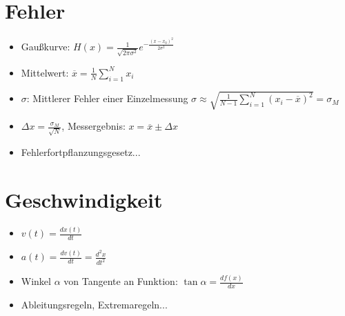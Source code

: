\documentclass[a4paper,10pt, fleqn]{article}
\begin{document}
\section{Fehler}
\label{sec:fehler}

\begin{itemize}
\item Gaußkurve:
  $H(x) =
  \frac{1}{\sqrt{2\pi\sigma^{2}}}e^{-\frac{(x-x_{0})^{2}}{2\sigma^{2}}}$
\item Mittelwert: $\overline{x} = \frac{1}{N}\sum_{i=1}^N x_i$
\item $\sigma$: Mittlerer Fehler einer Einzelmessung $\sigma \approx \sqrt{\frac{1}{N-1}\sum^N_{i=1}(x_i - \overline{x})^2} = \sigma_M $

\item $\Delta x = \frac{\sigma_M}{\sqrt{N}}$,
  Messergebnis: $x = \overline{x} \pm \Delta x$
\item Fehlerfortpflanzungsgesetz...
\end{itemize}

\section{Geschwindigkeit}
\label{sec:geschwindigkeit}
\begin{itemize}
\item $v(t) = \frac{dx(t)}{dt}$
\item $a(t) = \frac{dv(t)}{dt} = \frac{d^{2}x}{dt^{2}}$
\item Winkel $\alpha$
  von Tangente an Funktion: $\tan\alpha = \frac{df(x)}{dx}$

\item Ableitungsregeln, Extremaregeln...
\end{itemize}
\end{document}
